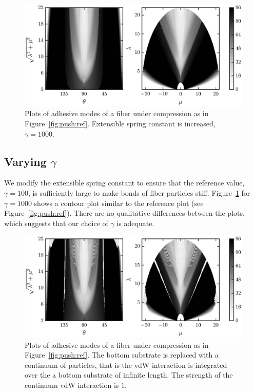 	\begin{figure}[t]
		\begin{center}
			\includegraphics{./fig/ch3/push/g1000/grid.eps}
		\end{center}		
		\caption{Plots of adhesive modes of a fiber under compression as in Figure~\ref{fig:push:ref}. Extensible spring constant is increased, $\gamma=1000$.
		\label{fig:push:g1000}}
	\end{figure}	

\subsection{Varying $\gamma$}

We modify the extensible spring constant to ensure that the reference value, $\gamma=100$, is sufficiently large to make bonds of fiber particles stiff. Figure~\ref{fig:push:g1000} for $\gamma=1000$ shows a contour plot similar to the reference plot (see Figure~\ref{fig:push:ref}). There are no qualitative differences between the plots, which suggests that our choice of $\gamma$ is adequate.

	\begin{figure}[t]
		\begin{center}
			\includegraphics{./fig/ch3/push/p1/grid.eps}
		\end{center}		
		\caption{Plots of adhesive modes of a fiber under compression as in Figure~\ref{fig:push:ref}. The bottom substrate is replaced with a continuum of particles, that is the vdW interaction is integrated over the a bottom substrate of infinite length. The strength of the continuum vdW interaction is $1$.
		\label{fig:push:p1}}
	\end{figure}

